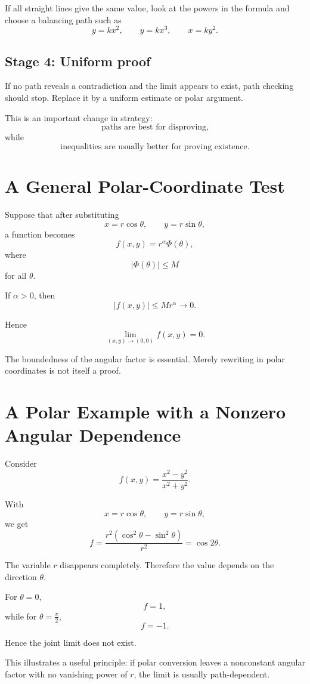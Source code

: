 \documentclass[11pt,oneside]{book}
\theoremstyle{studentthm}
\theoremstyle{definition}
\begin{document}
If all straight lines give the same value, look at the powers in the
formula and choose a balancing path such as
\[
y=kx^2,\qquad y=kx^3,\qquad x=ky^2.
\]

\subsection*{Stage 4: Uniform proof}

If no path reveals a contradiction and the limit appears to exist,
path checking should stop. Replace it by a uniform estimate or polar
argument.

This is an important change in strategy:
\[
\text{paths are best for disproving,}
\]
while
\[
\text{inequalities are usually better for proving existence.}
\]

\section{A General Polar-Coordinate Test}

Suppose that after substituting
\[
x=r\cos\theta,\qquad y=r\sin\theta,
\]
a function becomes
\[
f(x,y)=r^\alpha \Phi(\theta),
\]
where
\[
|\Phi(\theta)|\le M
\]
for all \(\theta\).

If \(\alpha>0\), then
\[
|f(x,y)|
\le
Mr^\alpha
\to0.
\]

Hence
\[
\lim_{(x,y)\to(0,0)}f(x,y)=0.
\]

The boundedness of the angular factor is essential. Merely rewriting in
polar coordinates is not itself a proof.

\section{A Polar Example with a Nonzero Angular Dependence}

Consider
\[
f(x,y)
=
\frac{x^2-y^2}{x^2+y^2}.
\]

With
\[
x=r\cos\theta,\qquad y=r\sin\theta,
\]
we get
\[
f
=
\frac{r^2(\cos^2\theta-\sin^2\theta)}{r^2}
=
\cos2\theta.
\]

The variable \(r\) disappears completely. Therefore the value depends
on the direction \(\theta\).

For \(\theta=0\),
\[
f=1,
\]
while for \(\theta=\frac{\pi}{2}\),
\[
f=-1.
\]

Hence the joint limit does not exist.

This illustrates a useful principle: if polar conversion leaves a
nonconstant angular factor with no vanishing power of \(r\), the limit
is usually path-dependent.
\end{document}
